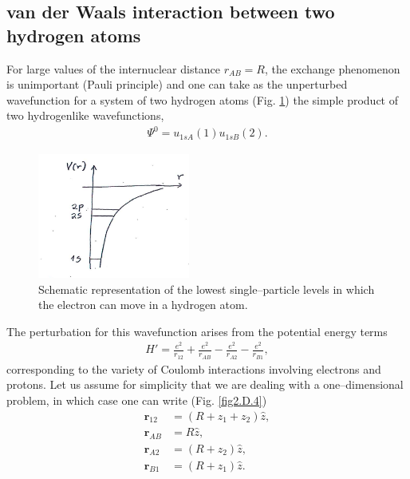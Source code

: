 \begin{subappendices}
\subsection{van der Waals interaction between two hydrogen atoms}
For large values of the internuclear distance $r_{AB}=R$, the exchange phenomenon is unimportant (Pauli principle) and one can take as the unperturbed wavefunction for a system of two hydrogen atoms (Fig. \ref{fig2.D.3}) the simple product of two hydrogenlike wavefunctions,
\begin{align}\label{eq2.D.1}
\Psi^0=u_{1sA}(1)u_{1sB}(2).
\end{align}
   \begin{figure}[h!]
    \centerline{\includegraphics*[width=5cm,angle=0]{nutshell/figs/fig2D3.pdf}}
    \caption{Schematic representation of the lowest single--particle levels in which the electron can move in a hydrogen atom.}\label{fig2.D.3}
    \end{figure}
The perturbation for this wavefunction arises from the potential energy terms
\begin{align}\label{eq2.D.2}
H'=\frac{e^2}{r_{12}}+\frac{e^2}{r_{AB}}-\frac{e^2}{r_{A2}}-\frac{e^2}{r_{B1}},
\end{align}
corresponding to the variety of Coulomb interactions involving electrons and protons. Let us assume for simplicity that we are dealing with a one--dimensional problem, in which case one can write (Fig. \ref{fig2.D.4})
\begin{align}\label{eq2.D.3}
\nonumber \mathbf r_{12}&=\left(R+z_1+z_2\right)\hat z,\\
\nonumber \mathbf r_{AB}&=R\hat z,\\
\nonumber \mathbf r_{A2}&=\left(R+z_2\right)\hat z,\\
\mathbf r_{B1}&=\left(R+z_1\right)\hat z.
\end{align}


\end{subappendices}

